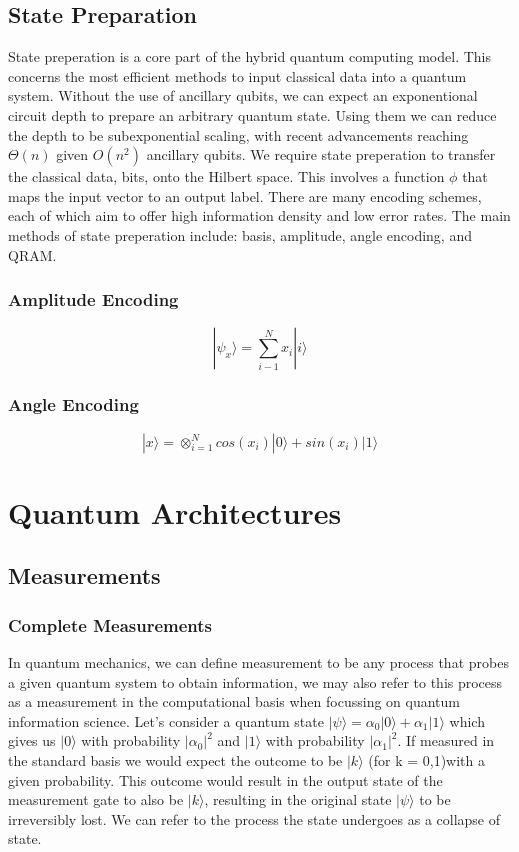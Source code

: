 \documentclass{article}
\begin{document}
\subsection{State Preparation}
State preperation is a core part of the hybrid quantum computing model. This 
concerns the most efficient methods to input classical data into a quantum system. 
Without the use of ancillary qubits, we can expect an exponentional circuit depth
to prepare an arbitrary quantum state. Using them we can reduce the depth to be 
subexponential scaling, with recent advancements reaching $\Theta(n)$ given $O(n^2)$
ancillary qubits.
\cite{stateprep1}
\cite{stateprep2}
We require state preperation to transfer the classical data, bits, onto the 
Hilbert space. This involves a function $\phi$ that maps the input vector to 
an output label. There are many encoding schemes, each of which aim to offer 
high information density and low error rates.
The main methods of state preperation include: basis, amplitude, angle encoding,
and QRAM. 

\subsubsection{Amplitude Encoding}
$$ |\psi_x\rangle = \sum_{i-1}^Nx_i|i\rangle$$

\subsubsection{Angle Encoding}

$$|x\rangle = \otimes^N_{i=1} cos(x_i)|0\rangle + sin(x_i)|1\rangle$$



\section{Quantum Architectures}
\subsection{Measurements}
\subsubsection{Complete Measurements}
In quantum mechanics, we can define measurement to be any process that probes a 
given quantum system to obtain information, we may also refer to this process as 
a measurement in the computational basis when focussing on quantum information 
science. Let's consider a quantum state 
$|\psi \rangle = \alpha_0|0\rangle+\alpha_1|1\rangle$ which gives us $|0\rangle$
with probability $|\alpha_0|^2$ and $|1\rangle$ with probability $|\alpha_1|^2$. 
If measured in the standard basis we would expect the outcome to be $|k\rangle$
(for k = 0,1)with a given probability. This outcome would result in the output 
state of the measurement gate to also be $|k\rangle$, resulting in the original 
state $|\psi\rangle$ to be irreversibly lost. We can refer to the process the state 
undergoes as a collapse of state. 
\end{document}
